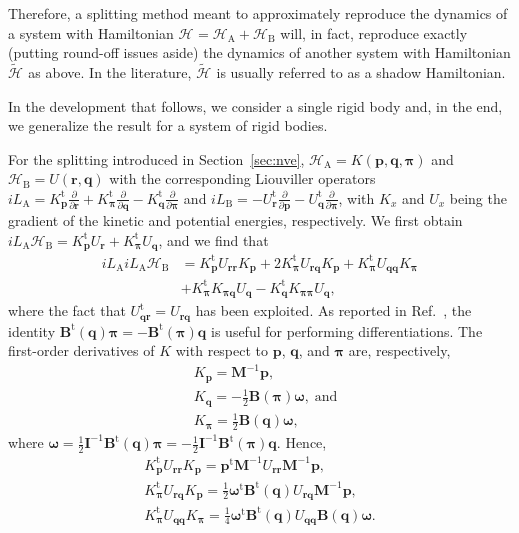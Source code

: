 \documentclass[
journal=jctcce,
layout=twocolumn
]{achemso}
\newcommand{\mt}[1]{\boldsymbol{\mathbf{#1}}}   %
\newcommand{\vt}[1]{\boldsymbol{\mathbf{#1}}}   %
\newcommand{\tr}[1]{#1^\text{t}}                %
\newcommand{\diff}[2]{\frac{\partial #1}{\partial #2}} %
\newcommand{\Ham}[1]{{\mathcal H}_\text{#1}}    %
\newcommand{\Liu}[1]{i\!L_\text{#1}}            %
\newcommand{\refined}[1]{\widetilde{#1}}
\begin{document}
Therefore, a splitting method meant to approximately reproduce the dynamics of a system with Hamiltonian $\Ham{} = \Ham A + \Ham B$ will, in fact, reproduce exactly (putting round-off issues aside) the dynamics of another system with Hamiltonian $\refined{\Ham{}}$ as above.
In the literature, $\refined{\Ham{}}$ is usually referred to as a shadow Hamiltonian.

In the development that follows, we consider a single rigid body and, in the end, we generalize the result for a system of rigid bodies.

For the splitting introduced in Section~\ref{sec:nve}, $\Ham A = K(\vt p, \vt q, \vt \pi)$ and $\Ham B = U(\vt r, \vt q)$ with the corresponding Liouviller operators $\Liu{A} = \tr{K_{\vt p}}\diff{}{\vt r} + \tr{K_{\vt \pi}}\diff{}{\vt q} - \tr{K_{\vt q}}\diff{}{\vt \pi}$ and $\Liu{B} = -\tr{U_{\vt r}}\diff{}{\vt p} - \tr{U_{\vt q}}\diff{}{\vt \pi}$, with $K_{x}$ and $U_{x}$ being the gradient of the kinetic and potential energies, respectively.
We first obtain $\Liu A \Ham B = \tr{K_{\vt p}} U_{\vt r} + \tr{K_{\vt \pi}} U_{\vt q}$, and we find that
\begin{align*}
\Liu A \Liu A \Ham B &= \tr{K_{\vt p}} U_{\vt r \vt r} K_{\vt p}
+ 2 \tr{K_{\vt \pi}} U_{\vt r \vt q} K_{\vt p}
+ \tr{K_{\vt \pi}} U_{\vt q \vt q} K_{\vt \pi} \\
&+ \tr{K_{\vt \pi}} K_{\vt \pi \vt q} U_{\vt q}
- \tr{K_{\vt q}} K_{\vt \pi \vt \pi} U_{\vt q},
\end{align*}
where the fact that $\tr{U_{\vt q \vt r}} = U_{\vt r \vt q}$ has been exploited.
As reported in Ref.~, the identity $\tr{\mt B}(\vt q) {\vt \pi} = -\tr{\mt B}(\vt \pi) {\vt q}$ is useful for performing differentiations.
The first-order derivatives of $K$ with respect to $\vt p$, $\vt q$, and $\vt \pi$ are, respectively,
\begin{align*}
&K_{\vt p} = {\mt M}^{-1} {\vt p}, \\
&K_{\vt q} = -\frac{1}{2} {\mt B}(\vt \pi) {\vt \omega}, \; \text{and} \\
&K_{\vt \pi} = \frac{1}{2} {\mt B}(\vt q) {\vt \omega},
\end{align*}
where $\vt \omega = \frac{1}{2} {\mt I}^{-1} \tr{\mt B}(\vt q) \vt \pi = -\frac{1}{2} {\mt I}^{-1} \tr{\mt B}(\vt \pi) \vt q$.\cite{Silveira_2017} Hence,
\begin{gather*}
\tr{K_{\vt p}} U_{\vt r \vt r} K_{\vt p} = \tr{\vt p} {\mt M}^{-1} U_{\vt r \vt r} {\mt M}^{-1} {\vt p}, \\
\tr{K_{\vt \pi}} U_{\vt r \vt q} K_{\vt p} = \frac{1}{2} \tr{\vt \omega} \tr{\mt B}(\vt q) U_{\vt r \vt q} {\mt M}^{-1} {\vt p}, \\
\tr{K_{\vt \pi}} U_{\vt q \vt q} K_{\vt \pi} = \frac{1}{4} \tr{\vt \omega} \tr{\mt B}(\vt q) U_{\vt q \vt q} {\mt B}(\vt q) \vt \omega.
\end{gather*}
\end{document}
